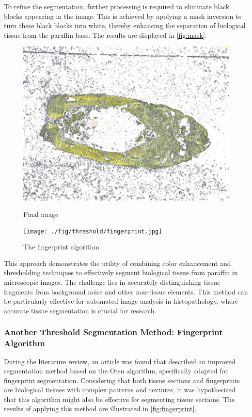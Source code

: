 To refine the segmentation, further processing is required to eliminate black blocks appearing in the image. This is achieved by applying a mask inversion to turn these black blocks into white, thereby enhancing the separation of biological tissue from the paraffin base. The results are displayed in \autoref{fig:mask}.

\begin{figure}[H]
    \centering
    \begin{minipage}{0.45\textwidth}
        \centering
        \includegraphics[width=\textwidth]{./fig/threshold/final.jpg}
        \caption{Final image}
        \label{fig:mask}
    \end{minipage}
    \begin{minipage}{0.45\textwidth}
        \centering
        \texttt{[image: ./fig/threshold/fingerprint.jpg]}
        \caption{The fingerprint algorithm}
        \label{fig:fingerprint}
    \end{minipage}
\end{figure}

This approach demonstrates the utility of combining color enhancement and thresholding techniques to effectively segment biological tissue from paraffin in microscopic images. The challenge lies in accurately distinguishing tissue fragments from background noise and other non-tissue elements. This method can be particularly effective for automated image analysis in histopathology, where accurate tissue segmentation is crucial for research.

\subsubsection{Another Threshold Segmentation Method: Fingerprint Algorithm}
During the literature review, an article was found that described an improved segmentation method based on the Otsu algorithm, specifically adapted for fingerprint segmentation. Considering that both tissue sections and fingerprints are biological tissues with complex patterns and textures, it was hypothesized that this algorithm might also be effective for segmenting tissue sections. The results of applying this method are illustrated in \autoref{fig:fingerprint}.

